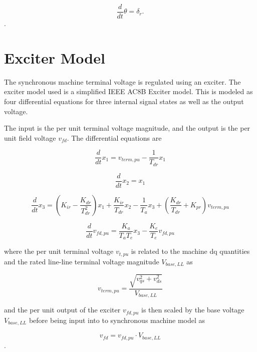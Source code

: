 \begin{equation}
    \frac{d}{dt} \theta = \delta_r.
\end{equation}.

\section{Exciter Model}

The synchronous machine terminal voltage is regulated using an exciter. The exciter model used is a simplified IEEE AC8B Exciter model. This is modeled as four differential equations for three internal signal states as well as the output voltage. 

The input is the per unit terminal voltage magnitude, and the output is the per unit field voltage $v_{fd}$. The differential equations are 

\begin{equation}
    \frac{d}{dt} x_1 = v_{term,pu} - \frac{1}{T_{dr}} x_1
\end{equation}

\begin{equation}
    \frac{d}{dt} x_2 = x_1
\end{equation}

\begin{equation}
    \frac{d}{dt} x_3 = \left( K_{ir} - \frac{K_{dr}}{T^2_{dr}} \right) x_1
    + \frac{K_{ir}}{T_{dr}} x_2 - \frac{1}{T_a} x_3
    + \left( \frac{K_{dr}}{T_{dr}} + K_{pr} \right) v_{term,pu}
\end{equation}

\begin{equation}
    \frac{d}{dt} v_{fd,pu} = \frac{K_a}{T_a T_e} x_3 - \frac{K_e}{T_e} v_{fd,pu}
\end{equation}

where the per unit terminal voltage $v_{t,pu}$ is related to the machine dq quantities and the rated line-line terminal voltage magnitude $V_{base,LL}$ as

\begin{equation}
    v_{term,pu} = \frac{\sqrt{v^2_{qs} + v^2_{ds}}}{V_{base,LL}}
\end{equation}

and the per unit output of the exciter $v_{fd,pu}$ is then scaled by the base voltage $V_{base,LL}$ before being input into to synchronous machine model as

\begin{equation}
    v_{fd} = v_{fd,pu} \cdot V_{base,LL}
\end{equation}.

